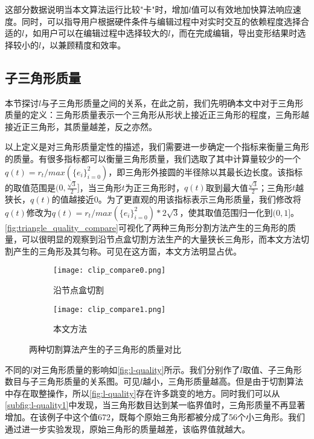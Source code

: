 这部分数据说明当本文算法运行比较"卡"时，增加$l$值可以有效地加快算法响应速度。同时，可以指导用户根据硬件条件与编辑过程中对实时交互的依赖程度选择合适的$l$，如用户可以在编辑过程中选择较大的$l$，而在完成编辑，导出变形结果时选择较小的$l$，以兼顾精度和效率。

\subsection{子三角形质量}
    本节探讨$l$与子三角形质量之间的关系，在此之前，我们先明确本文中对于三角形质量的定义：三角形质量表示一个三角形从形状上接近正三角形的程度，三角形越接近正三角形，其质量越差，反之亦然。

    以上定义是对三角形质量定性的描述，我们需要进一步确定一个指标来衡量三角形的质量。有很多指标都可以衡量三角形质量\cite{pebay2003}，我们选取了其中计算量较少的一个$q(t)=r_t/max(\{e_i\}^{2}_{i=0})$，即三角形外接圆的半径除以其最长边长度。该指标的取值范围是$(0, \frac{\sqrt{3}}{2}]$，当三角形$t$为正三角形时，$q(t)$取到最大值$\frac{\sqrt{3}}{2}$；三角形$t$越狭长，$q(t)$的值越接近0。为了更直观的用该指标表示三角形质量，我们修改将$q(t)$修改为$q(t)=r_t/max(\{e_i\}^{2}_{i=0})*2\sqrt{3}$，使其取值范围归一化到$(0, 1]$。\autoref{fig:triangle_quality_compare}可视化了两种三角形分割方法产生的三角形的质量，可以很明显的观察到沿节点盒切割方法生产的大量狭长三角形，而本文方法切割产生的三角形及其匀称。可见在这方面，本文方法明显占优。

\begin{figure}[htbp]
	\centering
	\begin{subfigure}[b]{.3\textwidth}
		\centering
		\texttt{[image: clip\_compare0.png]}
		\caption{沿节点盒切割}\label{subfig:clip_compare0}
	\end{subfigure}%
	\begin{subfigure}[b]{.3\textwidth}
		\centering
		\texttt{[image: clip\_compare1.png]}
		\caption{本文方法}\label{subfig:clip_compare1}
	\end{subfigure}
	\caption{两种切割算法产生的子三角形的质量对比}\label{fig:triangle_quality_compare}
\end{figure}

不同的$l$对三角形质量的影响如\autoref{fig:l-quality}所示。我们分别作了$l$取值、子三角形数目与子三角形质量的关系图。可见$l$越小，三角形质量越高。但是由于切割算法中存在取整操作，所以\autoref{fig:l-quality}存在许多跳变的地方。同时我们可以从\autoref{subfig:l-quality1}中发现，当三角形数目达到某一临界值时，三角形质量不再显著增加。在该例子中这个值672，既每个原始三角形都被分成了56个小三角形。我们通过进一步实验发现，原始三角形的质量越差，该临界值就越大。

